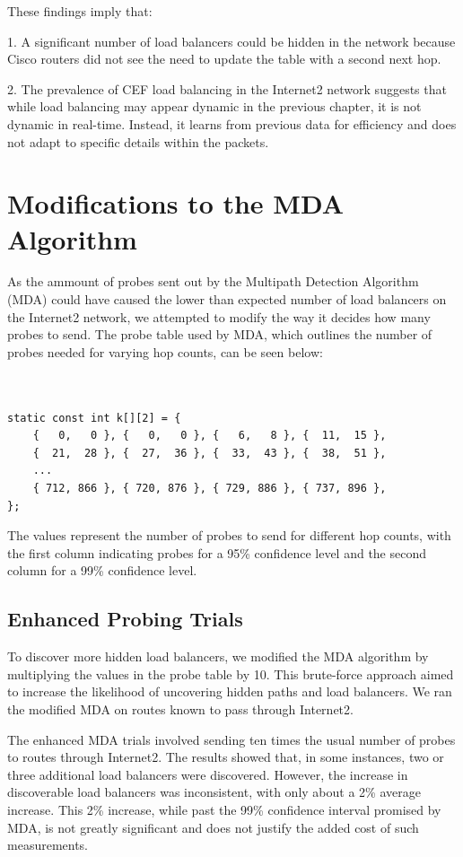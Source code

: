 \documentclass[12pt]{cwru_thesis}
\begin{document}
These findings imply that:

1. A significant number of load balancers could be hidden in the network because Cisco routers did not see the need to update the table with a second next hop.


2. The prevalence of CEF load balancing in the Internet2 network suggests that while load balancing may appear dynamic in the previous chapter, it is not dynamic in real-time. Instead, it learns from previous data for efficiency and does not adapt to specific details within the packets.


\section{Modifications to the MDA Algorithm}
\label{chap:MDA}

As the ammount of probes sent out by the Multipath Detection Algorithm (MDA) could have caused the lower than expected number of load balancers on the Internet2 network, we attempted to modify the way it decides how many probes to send.  The probe table used by MDA, which outlines the number of probes needed for varying hop counts, can be seen below:

\begin{verbatim}


static const int k[][2] = {
    {   0,   0 }, {   0,   0 }, {   6,   8 }, {  11,  15 },
    {  21,  28 }, {  27,  36 }, {  33,  43 }, {  38,  51 }, 
    ...
    { 712, 866 }, { 720, 876 }, { 729, 886 }, { 737, 896 }, 
};
\end{verbatim}

The values represent the number of probes to send for different hop counts, with the first column indicating probes for a 95\% confidence level and the second column for a 99\% confidence level.

\subsection{Enhanced Probing Trials}

To discover more hidden load balancers, we modified the MDA algorithm by multiplying the values in the probe table by 10. This brute-force approach aimed to increase the likelihood of uncovering hidden paths and load balancers. We ran the modified MDA on routes known to pass through Internet2.


The enhanced MDA trials involved sending ten times the usual number of probes to routes through Internet2. The results showed that, in some instances, two or three additional load balancers were discovered. However, the increase in discoverable load balancers was inconsistent, with only about a 2\% average increase. This 2\% increase, while past the 99\% confidence interval promised by MDA, is not greatly significant and does not justify the added cost of such measurements.
\end{document}
